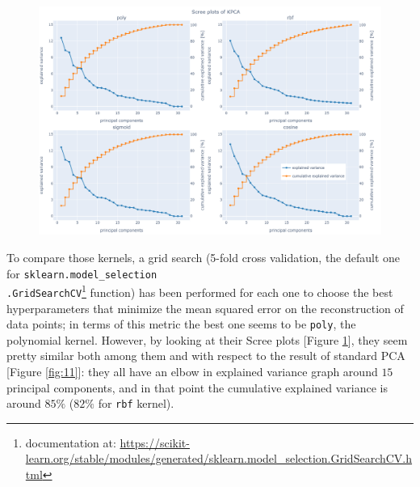 \documentclass[letterpaper]{article}
\begin{document}
	\begin{figure}[h]
		\centering
		\includegraphics[width=.9\textwidth]{images/scree_plot_kpca.png}
		\label{fig:14}
	\end{figure}
	To compare those kernels, a grid search (5-fold cross validation, the default one for \texttt{sklearn.model\_selection\\.GridSearchCV}\footnote{documentation at: \url{https://scikit-learn.org/stable/modules/generated/sklearn.model_selection.GridSearchCV.html}} function) has been performed for each one to choose the best hyperparameters that minimize the mean squared error on the reconstruction of data points; in terms of this metric the best one seems to be \texttt{poly}, the polynomial kernel. However, by looking at their Scree plots [Figure \ref{fig:14}], they seem pretty similar both among them and with respect to the result of standard PCA [Figure \ref{fig:11}]: they all have an elbow in explained variance graph around $15$ principal components, and in that point the cumulative explained variance is around $85\%$ ($82\%$ for \texttt{rbf} kernel).
	
\end{document}
